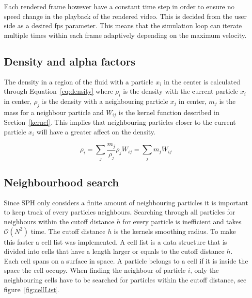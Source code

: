 Each rendered frame however have a constant time step in order to ensure no speed change in the playback of the rendered video. 
This is decided from the user side as a desired fps parameter. 
This means that the simulation loop can iterate multiple times within each frame adaptively depending on the maximum velocity.

\subsection{Density and alpha factors} \label{section:alpha}
    The density in a region of the fluid with a particle $x_i$ in the center is calculated through Equation~\ref{eq:density} where $\rho_i$ is the density with the current particle $x_i$ in center, $\rho_j$ is the density with a neighbouring particle $x_j$ in center, $m_j$ is the mass for a neighbour particle and $W_{ij}$ is the kernel function described in Section~\ref{kernel}. This implies that neighbouring particles closer to the current particle $x_i$ will have a greater affect on the density.    

    \begin{equation}\label{eq:density}
        \rho_i = \sum_j \frac{m_j}{\rho_j} \rho_j W_{ij} = \sum_j m_j W_{ij}
    \end{equation} 


\subsection{Neighbourhood search}
    Since SPH only considers a finite amount of neighbouring particles it is important to keep track of every particles neighbours.
    Searching through all particles for neighbours within the cutoff distance $h$ for every particle is inefficient and takes $\mathcal{O}({N^2})$ time.
    The cutoff distance $h$ is the kernels smoothing radius.
    To make this faster a cell list was implemented.
    A cell list is a data structure that is divided into cells that have a length larger or equals to the cutoff distance $h$.
    Each cell spans on a surface in space.
    A particle belongs to a cell if it is inside the space the cell occupy.
    When finding the neighbour of particle $i$, only the neighbouring cells have to be searched for particles within the cutoff distance, see figure~\ref{fig:cellList}.
    
